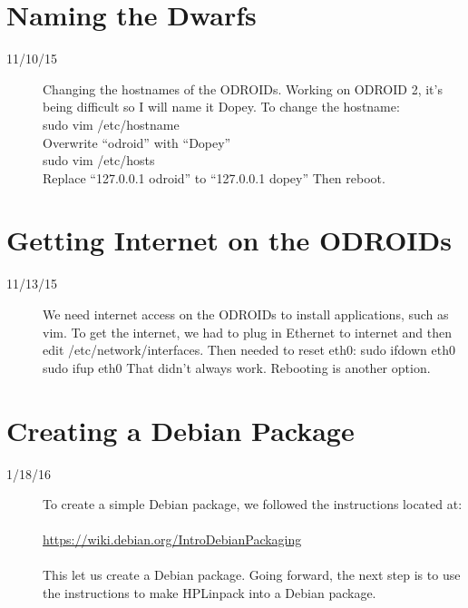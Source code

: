 \section{Naming the Dwarfs}
\begin{description}
\item[11/10/15] Changing the hostnames of the ODROIDs. Working on ODROID 2, it's being difficult so I will name it Dopey. To change the hostname: \\
sudo vim /etc/hostname \\
Overwrite ``odroid'' with ``Dopey'' \\
sudo vim /etc/hosts \\
Replace ``127.0.0.1 odroid'' to ``127.0.0.1 dopey''
Then reboot.
\end{description}

\section{Getting Internet on the ODROIDs}
\begin{description}
\item [11/13/15] We need internet access on the ODROIDs to install applications, such as vim. To get the internet, we had to plug in Ethernet to internet and then edit /etc/network/interfaces. Then needed to reset eth0:
sudo ifdown eth0
sudo ifup eth0
That didn't always work. Rebooting is another option.
\end{description}

\section{Creating a Debian Package}
\begin{description}
\item [1/18/16] To create a simple Debian package, we followed the instructions located at:\\ \\
\url{https://wiki.debian.org/IntroDebianPackaging}\\ \\
This let us create a Debian package. Going forward, the next step is to use the instructions to make HPLinpack into a Debian package.
\end{description}

